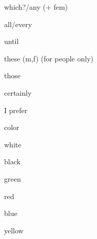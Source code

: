 \documentclass[avery5371,grid,frame]{flashcards}
\begin{document}
\begin{flashcard}{\LARGE which?/any (+ fem)}
\LARGE {}
\end{flashcard}
\begin{flashcard}{\LARGE all/every}
\LARGE {}
\end{flashcard}
\begin{flashcard}{\LARGE until}
\LARGE {}
\end{flashcard}
\begin{flashcard}{\LARGE these (m,f) (for people only)}
\LARGE {}
\end{flashcard}
\begin{flashcard}{\LARGE those}
\LARGE {}
\end{flashcard}
\begin{flashcard}{\LARGE certainly}
\LARGE {}
\end{flashcard}
\begin{flashcard}{\LARGE I prefer}
\LARGE {}
\end{flashcard}
\begin{flashcard}{\LARGE color}
\LARGE {}
\end{flashcard}
\begin{flashcard}{\LARGE white}
\LARGE {}
\end{flashcard}
\begin{flashcard}{\LARGE black}
\LARGE {}
\end{flashcard}
\begin{flashcard}{\LARGE green}
\LARGE {}
\end{flashcard}
\begin{flashcard}{\LARGE red}
\LARGE {}
\end{flashcard}
\begin{flashcard}{\LARGE blue}
\LARGE {}
\end{flashcard}
\begin{flashcard}{\LARGE yellow}
\LARGE {}
\end{flashcard}
\end{document}
